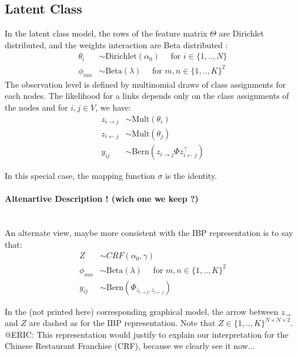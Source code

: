 \documentclass[a4paper, 12pt]{article}
\begin{document}
\subsection{Latent Class}

In the latent class model, the rows of the feature matrix $\Theta$ are Dirichlet distributed, and the weights interaction are Beta distributed : 
\begin{align}
\theta_i &\sim \mathrm{Dirichlet}(\alpha_0) \quad\text{ for }  i \in \{1, .., N\} \\
\phi_{mn} &\sim \mathrm{Beta}(\lambda) \quad\text{ for }  m,n \in \{1, .., K\}^2 
\end{align}
The observation level is defined by multinomial draws of class assignments for each nodes. The likelihood for a links depends only on the class assignments of the nodes  and for $i, j \in V$, we have:  
\begin{align}
z_{i\rightarrow j} &\sim \mathrm{Mult}(\theta_i) \\
z_{i\leftarrow j} &\sim \mathrm{Mult}(\theta_j) \\
y_{ij} &\sim \mathrm{Bern}(z_{i\rightarrow j} \Phi z_{i\leftarrow j}^\top)
\end{align}

In this special case, the mapping function $\sigma$ is the identity.

\paragraph{Altenartive Description ! (wich one we keep ?)}~\\

An alternate view, maybe more consistent with the IBP representation is to say that:
\begin{align}
Z &\sim CRF(\alpha_0, \gamma) \\
\phi_{mn} &\sim \mathrm{Beta}(\lambda) \quad\text{ for }  m,n \in \{1, .., K\}^2  \\
y_{ij} &\sim \mathrm{Bern}(\Phi_{z_{i\rightarrow j} , z_{i\leftarrow j}})
\end{align}

In the (not printed here) corresponding graphical model, the arrow between $z_{\rightarrow}$ and $Z$ are dashed as for the IBP representation. Note that $Z \in \{1,.., K\}^{N\times N \times 2}$. ~\\

@ERIC: This representation would justify to explain our interpretation for the Chinese Restaurant Franchise (CRF), because we clearly see it now...
\end{document}
